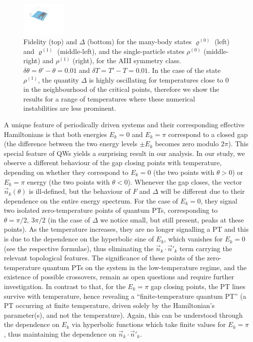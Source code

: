 \begin{figure}[h!]
\begin{minipage}{1.22\textwidth}
\begin{flushleft}
\includegraphics[width=0.20\textwidth,height=0.15\textwidth]{a3uhls1}
\end{flushleft}
\end{minipage}
\begin{minipage}{1\textwidth}	
\caption{Fidelity (top) and $\Delta$ (bottom) for the many-body states $\varrho^{(0)}$ (left)  and $\varrho^{(1)}$ (middle-left), and the single-particle states $\rho^{(0)}$ (middle-right) and $\rho^{(1)}$ (right), for the AIII symmetry class. $\delta \theta =\theta'-\theta=0.01$ and $\delta T=T'-T=0.01$. In the case of the state $\rho^{(1)}$, the quantity $\Delta$ is highly oscillating for temperatures close to $0$ in the neighbourhood of the critical points, therefore we show the results for a range of temperatures where these numerical instabilities are less prominent.}
\label{fig:fidelityAIII}
\end{minipage}
\end{figure}


A unique feature of periodically driven systems and their corresponding effective Hamiltonians is that both energies $E_k = 0$ and $E_k = \pi$ correspond to a closed gap (the difference between the two energy levels $\pm E_k$ becomes zero modulo $2\pi$). This special feature of QWs yields a surprising result in our analysis. In our study, we observe a different behaviour of the gap closing points with temperature, depending on whether they correspond to $E_k = 0$ (the two points with $\theta > 0$) or $E_k = \pi$ energy (the two points with $\theta < 0$). 
 Whenever the gap closes, the vector $\vec{n}_k(\theta)$ is ill-defined, but the behaviour of $F$ and $\Delta$ will be different due to their dependence on the entire energy spectrum. For the case of $E_k = 0$, they signal two isolated zero-temperature points of quantum PTs, corresponding to $\theta = \pi /2,\ 3\pi /2$ (in the case of $\Delta$ we notice small, but still present, peaks at these points). As the temperature increases, they are no longer signalling a PT and this is due to the dependence on the hyperbolic sine of $E_k$, which vanishes for $E_k=0$ (see the respective formulae), thus eliminating the $\vec {n}_k\cdot \vec {n}'_k$ term carrying the relevant topological features. The significance of these points of the zero-temperature quantum PTs on the system in the low-temperature regime, and the existence of possible crossovers, remain as open questions and require further investigation. In contrast to that, for the $E_k=\pi$ gap closing points, the PT lines survive with temperature, hence revealing a ``finite-temperature quantum PT'' (a PT occurring at finite temperature, driven solely by the Hamiltonian's parameter(s), and not the temperature). Again, this can be understood through the dependence on $E_k$ via hyperbolic functions which take finite values for $E_k=\pi$, thus maintaining the dependence on $\vec{n}_k\cdot\vec{n}'_k$.
 
